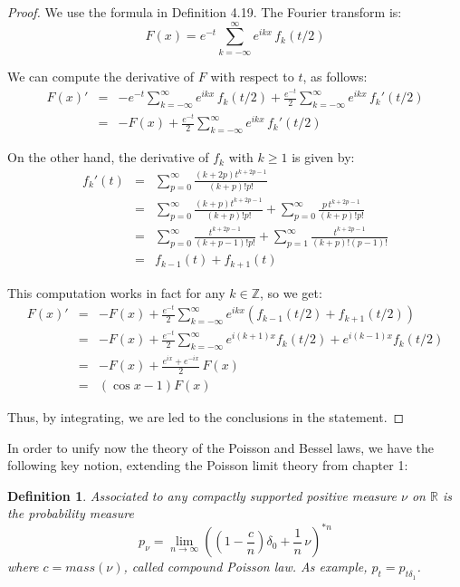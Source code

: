 \documentclass[12pt]{amsbook}
\newtheorem{definition}[theorem]{Definition}
\begin{document}
\begin{proof}
We use the formula in Definition 4.19. The Fourier transform is:
$$F(x)=e^{-t}\sum_{k=-\infty}^\infty e^{ikx}\,f_k(t/2)$$

We can compute the derivative of $F$ with respect to $t$, as follows:
\begin{eqnarray*}
F(x)'
&=&-e^{-t}\sum_{k=-\infty}^\infty e^{ikx}\,f_k(t/2)+\frac{e^{-t}}{2}\sum_{k=-\infty}^\infty e^{ikx}\,f_k'(t/2)\\
&=&-F(x)+\frac{e^{-t}}{2}\sum_{k=-\infty}^\infty e^{ikx}\,f_k'(t/2)
\end{eqnarray*}

On the other hand, the derivative of $f_k$ with $k\geq 1$ is given by:
\begin{eqnarray*}
f_k'(t)
&=&\sum_{p=0}^\infty \frac{(k+2p)t^{k+2p-1}}{(k+p)!p!}\\
&=&\sum_{p=0}^\infty \frac{(k+p)t^{k+2p-1}}{(k+p)!p!}+\sum_{p=0}^\infty\frac{p\,t^{k+2p-1}}{(k+p)!p!}\\
&=&\sum_{p=0}^\infty \frac{t^{k+2p-1}}{(k+p-1)!p!}+\sum_{p=1}^\infty\frac{t^{k+2p-1}}{(k+p)!(p-1)!}\\
&=&f_{k-1}(t)+f_{k+1}(t)
\end{eqnarray*}

This computation works in fact for any $k\in\mathbb Z$, so we get:
\begin{eqnarray*}
F(x)'
&=&-F(x)+\frac{e^{-t}}{2}
\sum_{k=-\infty}^\infty e^{ikx} (f_{k-1}(t/2)+f_{k+1}(t/2))\\
&=&-F(x)+\frac{e^{-t}}{2} \sum_{k=-\infty}^\infty
e^{i(k+1)x}f_{k}(t/2)+e^{i(k-1)x}f_{k}(t/2)\\
&=&-F(x)+\frac{e^{ix}+e^{-ix}}{2}\,F(x)\\
&=&(\cos x-1)F(x)
\end{eqnarray*}

Thus, by integrating, we are led to the conclusions in the statement.
\end{proof}

In order to unify now the theory of the Poisson and Bessel laws, we have the following key notion, extending the Poisson limit theory from chapter 1:


\begin{definition}
Associated to any compactly supported positive measure $\nu$ on $\mathbb R$ is the probability measure
$$p_\nu=\lim_{n\to\infty}\left(\left(1-\frac{c}{n}\right)\delta_0+\frac{1}{n}\,\nu\right)^{*n}$$
where $c=mass(\nu)$, called compound Poisson law. As example, $p_t=p_{t\delta_1}$.
\end{definition}
\end{document}
